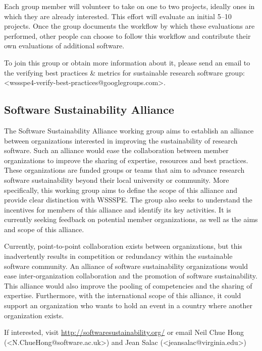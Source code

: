 \documentclass[11pt, oneside]{amsart}
\newcommand{\note}[1]{ {\textcolor{blueish}    { ***Note:      #1 }}}
\begin{document}
Each group member will volunteer to take on one to two projects, ideally ones in which they are already interested.  This effort will evaluate an initial 5--10 projects.  Once the group documents the workflow by which these evaluations are performed, other people can choose to follow this workflow and contribute their own evaluations of additional software.

To join this group or obtain more information about it, please send an email to the verifying best practices \& metrics for sustainable research software group: <wssspe4-verify-best-practices@googlegroups.com>.


\subsection{Software Sustainability Alliance}
\label{sec:alliance}


The Software Sustainability Alliance working group aims to establish an alliance between organizations interested in improving the sustainability of research software. Such an alliance would ease the collaboration between member organizations to improve the sharing of expertise, resources and best practices. 
These organizations are funded groups or teams that aim to advance research software sustainability beyond their local university or community. More specifically, this working group aims to define the scope of this alliance and provide clear distinction with WSSSPE. The group also seeks to understand the incentives for members of this alliance and identify its key activities.
It is currently seeking feedback on potential member organizations, as well as the aims and scope of this alliance.

Currently, point-to-point collaboration exists between organizations, but this inadvertently results in competition or redundancy within the sustainable software community. An alliance of software sustainability organizations would ease inter-organization collaboration and the promotion of software sustainability. This alliance would also improve the pooling of competencies and the sharing of expertise. Furthermore, with the international scope of this alliance, it could support an organization who wants to hold an event in a country where another organization exists.

If interested, visit \url{http://softwaresustainability.org/} or email Neil Chue Hong (<N.ChueHong@software.ac.uk>) and Jean Salac (<jeansalac@virginia.edu>)
\end{document}
